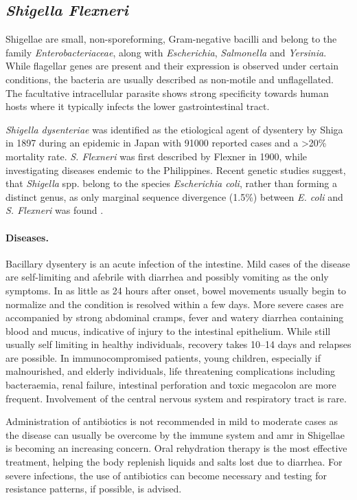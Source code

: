 \subsection{\textit{Shigella Flexneri}}
Shigellae are small, non-sporeforming, Gram-negative bacilli and belong to the family \textit{Enterobacteriaceae}, along with \textit{Escherichia}, \textit{Salmonella} and \textit{Yersinia}. While flagellar genes are present and their expression is observed under certain conditions, the bacteria are usually described as non-motile and unflagellated. The facultative intracellular parasite shows strong specificity towards human hosts where it typically infects the lower gastrointestinal tract.

\textit{Shigella dysenteriae} was identified as the etiological agent of dysentery by Shiga in 1897 during an epidemic in Japan with 91000 reported cases and a \textgreater 20\% mortality rate. \textit{S. Flexneri} was first described by Flexner in 1900, while investigating diseases endemic to the Philippines. Recent genetic studies suggest, that \textit{Shigella} spp. belong to the species \textit{Escherichia coli}, rather than forming a distinct genus, as only marginal sequence divergence (1.5\%) between \textit{E. coli} and \textit{S. Flexneri} was found \citep{Schroeder2008,Croxen2010}.

\paragraph{Diseases.}
Bacillary dysentery is an acute infection of the intestine. Mild cases of the disease are self-limiting and afebrile with diarrhea and possibly vomiting as the only symptoms. In as little as 24 hours after onset, bowel movements usually begin to normalize and the condition is resolved within a few days. More severe cases are accompanied by strong abdominal cramps, fever and watery diarrhea containing blood and mucus, indicative of injury to the intestinal epithelium. While still usually self limiting in healthy individuals, recovery takes 10--14 days and relapses are possible. In immunocompromised patients, young children, especially if malnourished, and elderly individuals, life threatening complications including bacteraemia, renal failure, intestinal perforation and toxic megacolon are more frequent. Involvement of the central nervous system and respiratory tract is rare.

Administration of antibiotics is not recommended in mild to moderate cases as the disease can usually be overcome by the immune system and \gls{amr} in Shigellae is becoming an increasing concern. Oral rehydration therapy is the most effective treatment, helping the body replenish liquids and salts lost due to diarrhea. For severe infections, the use of antibiotics can become necessary and testing for resistance patterns, if possible, is advised.

